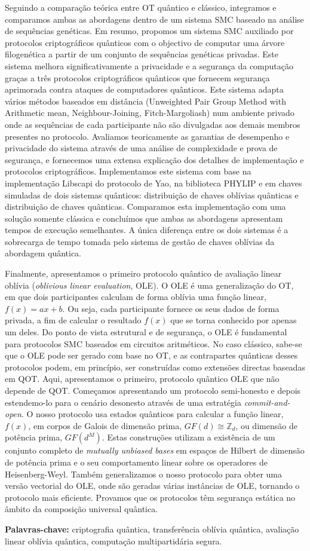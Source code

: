 Seguindo a comparação teórica entre OT quântico e clássico, integramos e comparamos ambas as abordagens dentro de um sistema SMC baseado na análise de sequências genéticas. Em resumo, propomos um sistema SMC auxiliado por protocolos criptográficos quânticos com o objectivo de computar uma árvore filogenética a partir de um conjunto de sequências genéticas privadas. Este sistema melhora significativamente a privacidade e a segurança da computação graças a três protocolos criptográficos quânticos que fornecem segurança aprimorada contra ataques de computadores quânticos. Este sistema adapta vários métodos baseados em distância (Unweighted Pair Group Method with Arithmetic mean, Neighbour-Joining, Fitch-Margoliash) num ambiente privado onde as sequências de cada participante não são divulgadas aos demais membros presentes no protocolo. Avaliamos teoricamente as garantias de desempenho e privacidade do sistema através de uma análise de complexidade e prova de segurança, e fornecemos uma extensa explicação dos detalhes de implementação e protocolos criptográficos. Implementamos este sistema com base na implementação Libscapi do protocolo de Yao, na biblioteca PHYLIP e em chaves simuladas de dois sistemas quânticos: distribuição de chaves oblívias quânticas e distribuição de chaves quânticas. Comparamos esta implementação com uma solução somente clássica e concluímos que ambas as abordagens apresentam tempos de execução semelhantes. A única diferença entre os dois sistemas é a sobrecarga de tempo tomada pelo sistema de gestão de chaves oblívias da abordagem quântica.

Finalmente, apresentamos o primeiro protocolo quântico de  avaliação linear oblívia (\textit{oblivious linear evaluation}, OLE). O OLE é uma generalização do OT, em que dois participantes calculam de forma oblívia uma função linear, $f(x) = ax + b$. Ou seja, cada participante fornece os seus dados de forma privada, a fim de calcular o resultado $f(x)$ que se torna conhecido por apenas um deles. Do ponto de vista estrutural e de segurança, o OLE é fundamental para protocolos SMC baseados em circuitos aritméticos. No caso clássico, sabe-se que o OLE pode ser gerado com base no OT, e as contrapartes quânticas desses protocolos podem, em princípio, ser construídas como extensões directas baseadas em QOT. Aqui, apresentamos o primeiro, protocolo quântico OLE que não depende de QOT. Começamos apresentando um protocolo semi-honesto e depois estendemo-lo para o cenário desonesto através de uma estratégia \textit{commit-and-open}. O nosso protocolo usa estados quânticos para calcular a função linear, $f(x)$, em corpos de Galois de dimensão prima, $GF(d) \cong \mathbb{Z}_d$, ou dimensão de potência prima, $GF(d^M)$. Estas construções utilizam a existência de um conjunto completo de \textit{mutually unbiased bases} em espaços de Hilbert de dimensão de potência prima e o seu comportamento linear sobre os operadores de Heisenberg-Weyl. Também generalizamos o nosso protocolo para obter uma versão vectorial do OLE, onde são geradas várias instâncias de OLE, tornando o protocolo mais eficiente. Provamos que os protocolos têm segurança estática no âmbito da composição universal quântica.

\vfill
\begin{flushleft}
\textbf{Palavras-chave:} criptografia qu\^{a}ntica, transferência oblívia quântica, avaliação linear oblívia quântica, computação multipartidária segura.
\end{flushleft}
